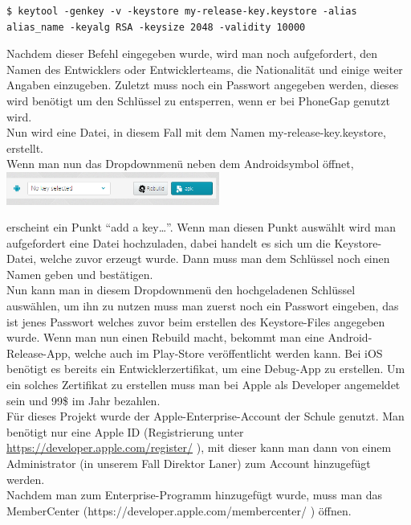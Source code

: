 \begin{lstlisting}
$ keytool -genkey -v -keystore my-release-key.keystore -alias alias_name -keyalg RSA -keysize 2048 -validity 10000
\end{lstlisting}

Nachdem dieser Befehl eingegeben wurde, wird man noch aufgefordert, den Namen des Entwicklers oder Entwicklerteams, die Nationalität und einige weiter Angaben einzugeben. Zuletzt muss noch ein Passwort angegeben werden, dieses wird benötigt um den Schlüssel zu entsperren, wenn er bei PhoneGap genutzt wird.\\
Nun wird eine Datei, in diesem Fall mit dem Namen my-release-key.keystore, erstellt.\\
Wenn man nun das Dropdownmenü neben dem Androidsymbol öffnet,\\

\includegraphics[keepaspectratio=true, width=7cm]{images/phoneGap/PhoneGap3.png}

erscheint ein Punkt \enquote{add a key…}. Wenn man diesen Punkt auswählt wird man aufgefordert eine Datei hochzuladen, dabei handelt es sich um die Keystore-Datei, welche zuvor erzeugt wurde. Dann muss man dem Schlüssel noch einen Namen geben und bestätigen.\\
Nun kann man in diesem Dropdownmenü den hochgeladenen Schlüssel auswählen, um ihn zu nutzen muss man zuerst noch ein Passwort eingeben, das ist jenes Passwort welches zuvor beim erstellen des Keystore-Files angegeben wurde. Wenn man nun einen Rebuild macht, bekommt man eine Android-Release-App, welche auch im Play-Store veröffentlicht werden kann.
Bei iOS benötigt es bereits ein Entwicklerzertifikat, um eine Debug-App zu erstellen. Um ein solches Zertifikat zu erstellen muss man bei Apple als Developer angemeldet sein und 99\$ im Jahr bezahlen.\\
Für dieses Projekt wurde der Apple-Enterprise-Account der Schule genutzt. Man benötigt nur eine Apple ID (Registrierung unter \href{https://developer.apple.com/register/}{https://developer.apple.com/register/} ), mit dieser kann man dann von einem Administrator (in unserem Fall Direktor Laner) zum Account hinzugefügt werden.\\
Nachdem man zum Enterprise-Programm hinzugefügt wurde, muss man das MemberCenter (https://developer.apple.com/membercenter/ ) öffnen.\\

